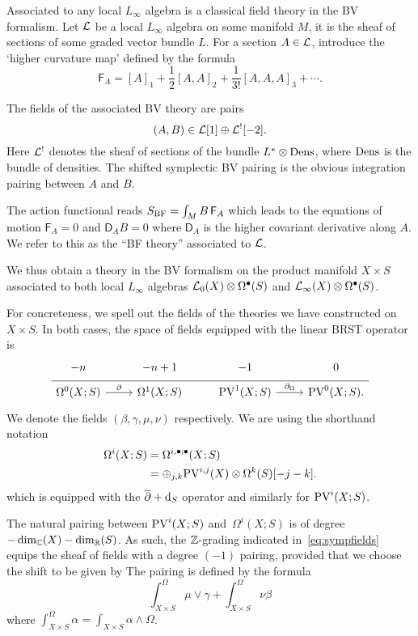 \parsec[s:bf]

Associated to any local $L_\infty$ algebra is a classical field theory in the BV formalism.
Let $\mathcal L$ be a local $L_\infty$ algebra on some manifold $M$, it is the sheaf of sections of some graded vector bundle $L$. 
For a section $A \in \mathcal L$, introduce the `higher curvature map' defined by the formula
\[
\mathsf{F}_A = [A]_1 + \frac12 [A,A]_2 + \frac{1}{3!} [A,A,A]_3 + \cdots .
\]

The fields of the associated BV theory are pairs
\[
  (A, B) \in \mathcal L[1] \oplus \mathcal L^{!}[-2] .
\]
Here $\mathcal L^!$ denotes the sheaf of sections of the bundle $L^* \otimes {\rm Dens}$, where ${\rm Dens}$ is the bundle of densities. 
The shifted symplectic BV pairing is the obvious integration pairing between $A$ and $B$. 

The action functional reads $S_{\rm BF} = \int_M B \, \mathsf{F}_{A}$ which leads to the equations of motion $\mathsf{F}_{A} = 0$ and $\mathsf{D}_A B= 0$ where $\mathsf{D}_A$ is the higher covariant derivative along $A$. 
We refer to this as the ``BF theory'' associated to $\mathcal L$.

We thus obtain a theory in the BV formalism on the product manifold $X \times S$ associated to both local $L_\infty$ algebras $\mathcal L_0(X) \otimes \Omega^{\bullet}(S)$ and $\mathcal L_\infty(X) \otimes \Omega^\bullet(S)$.

\parsec
For concreteness, we spell out the fields of the theories we have constructed on $X \times S$.
In both cases, the space of fields equipped with the linear BRST operator is
\begin{equation}
  \label{eq:sympfields} 
  \begin{tikzcd}[row sep = 1 ex]
    -n & -n + 1 & -1 & 0 \\ \hline
    \Omega^{0}(X;S) \ar[r, "\del"] & \Omega^{1}(X;S) & 
     \PV^{1}(X; S) \ar[r, "\div"] & \PV^{0}(X; S).
\end{tikzcd}
\end{equation}
We denote the fields $(\beta,\gamma,\mu,\nu)$ respectively.
We are using the shorthand notation
\begin{align*}
\Omega^{i}(X;S) & = \Omega^{i , \bullet;\bullet}(X;S) \\
 & = \oplus_{j,k} {\rm PV}^{i,j}(X) \otimes \Omega^k(S) [-j-k] .
\end{align*}
which is equipped with the $\overline{\partial} + {\rm d}_S$ operator and similarly for ${\rm PV}^{i}(X;S)$. 

The natural pairing between ${\rm PV}^i(X;S)$ and~$\Omega^i(X;S)$ is of degree $-\dim_{\mathbb{C}}(X) -\dim_{\mathbb{R}}(S)$. 
As such, the $\mathbb{Z}$-grading indicated in~\eqref{eq:sympfields} equips the sheaf of fields with a degree $(-1)$ pairing, provided that we choose the shift to be given by
The pairing is defined by the formula 
\[
\int^\Omega_{X \times S} \mu \vee \gamma + \int^\Omega_{X \times S} \nu \beta 
\]
where $\int^\Omega_{X \times S} \alpha = \int_{X \times S} \alpha \wedge \Omega$. 

